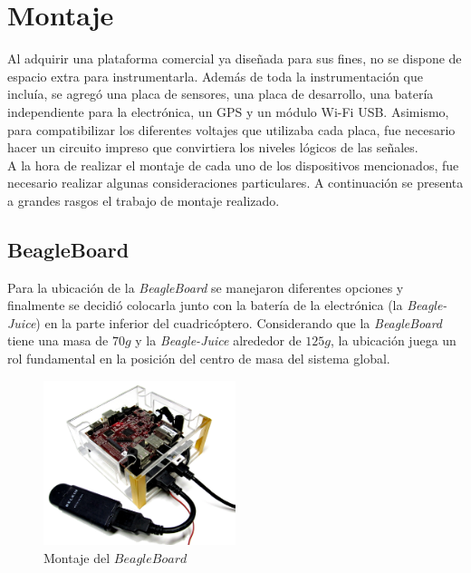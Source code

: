 \documentclass[main]{subfiles}
\begin{document}
\chapter{Montaje}
\label{chap:montaje}

Al adquirir una plataforma comercial ya diseñada para sus fines, no se dispone de espacio extra para instrumentarla. Además de toda la instrumentación que incluía, se agregó una placa de sensores, una placa de desarrollo, una batería independiente para la electrónica, un GPS y un módulo Wi-Fi USB. Asimismo, para compatibilizar los diferentes voltajes que utilizaba cada placa, fue necesario hacer un circuito impreso que convirtiera los niveles lógicos de las señales.\\

A la hora de realizar el montaje de cada uno de los dispositivos mencionados, fue necesario realizar algunas consideraciones particulares. A continuación se presenta a grandes rasgos el trabajo de montaje realizado.

\section{BeagleBoard}

Para la ubicación de la \emph{BeagleBoard} se manejaron diferentes opciones y finalmente se decidió colocarla junto con la batería de la electrónica (la \emph{Beagle-Juice}) en la parte inferior del cuadricóptero. Considerando que la \emph{BeagleBoard} tiene una masa de $70g$ y la \emph{Beagle-Juice} alrededor de $125g$, la ubicación juega un rol fundamental en la posición del centro de masa del sistema global.\\

\begin{figure}
	\centering
	\vspace{-20pt}
		\includegraphics[width=0.5\textwidth]{./pics_montaje/beagle.jpg}
	\caption{Montaje del $BeagleBoard$}
	\vspace{-20pt}
	\label{fig:beagle}
\end{figure}
\end{document}
